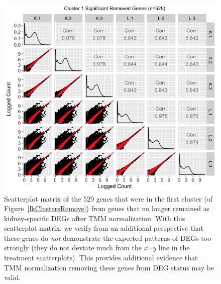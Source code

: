 \documentclass[11pt,a4paper,oldfontcommands,openany]{memoir}
\numberwithin{equation}{section} %
\begin{document}
\null
\begin{figure}[t!]
\begin{framed}
\centerline{\includegraphics[width=1\columnwidth]{MakeFigures/lkClustersRemoveSM.jpg}}
\end{framed}
\caption{Scatterplot matrix of the 529 genes that were in the first cluster (of Figure~\ref{lkClustersRemove}) from genes that no longer remained as kidney-specific DEGs after TMM normalization. With this scatterplot matrix, we verify from an additional perspective that these genes do \textit{not} demonstrate the expected patterns of DEGs too strongly (they do not deviate much from the \textit{x=y} line in the treatment scatterplots). This provides additional evidence that TMM normalization removing these genes from DEG status may be valid.
\label{lkClustersRemoveSM}}
\end{figure}
\end{document}
